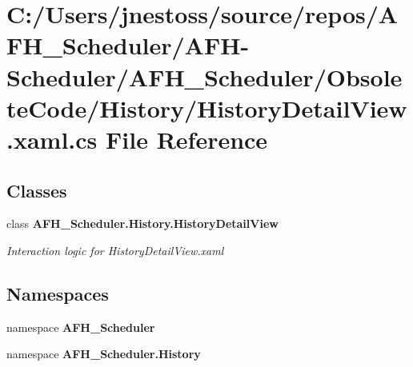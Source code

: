 \section{C\+:/\+Users/jnestoss/source/repos/\+A\+F\+H\+\_\+\+Scheduler/\+A\+F\+H-\/\+Scheduler/\+A\+F\+H\+\_\+\+Scheduler/\+Obsolete\+Code/\+History/\+History\+Detail\+View.xaml.\+cs File Reference}
\label{_history_detail_view_8xaml_8cs}
\subsection*{Classes}
\begin{DoxyCompactItemize}
\item 
class \textbf{ A\+F\+H\+\_\+\+Scheduler.\+History.\+History\+Detail\+View}
\begin{DoxyCompactList}\small\item\em Interaction logic for History\+Detail\+View.\+xaml \end{DoxyCompactList}\end{DoxyCompactItemize}
\subsection*{Namespaces}
\begin{DoxyCompactItemize}
\item 
namespace \textbf{ A\+F\+H\+\_\+\+Scheduler}
\item 
namespace \textbf{ A\+F\+H\+\_\+\+Scheduler.\+History}
\end{DoxyCompactItemize}
